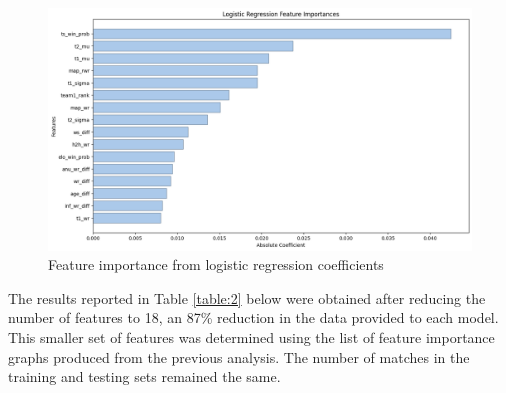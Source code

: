 \clearpage

\begin{figure}[h]
	
	\centering
	\begin{adjustbox}{center} %
		\includegraphics[width=1.3\textwidth]{Figures/logreg-imp.png}
	\end{adjustbox}
	\caption{Feature importance from logistic regression coefficients}
	\label{fig:logimp}
\end{figure}

The results reported in Table \ref{table:2} below were obtained after reducing the number of features to 18, an 87\% reduction in the data provided to each model. This smaller set of features was determined using the list of feature importance graphs produced from the previous analysis. The number of matches in the training and testing sets remained the same.

